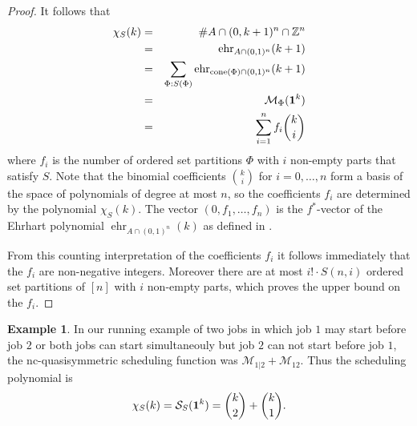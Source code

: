 \documentclass[12pt,reqno]{amsart}
\numberwithin{definition}{section}
\theoremstyle{definition}
\newtheorem{example}[definition]{Example}
\newcommand{\ZZ}{\mathbb{Z}}
\newcommand{\SSS}{\mathcal{S}}
\newcommand{\ehr}{\operatorname{ehr}}
\newcommand{\cone}{\operatorname{cone}}
\newcommand{\ncM}{\mathcal{M}}
\newcommand{\poly}{\chi} %
\begin{document}
\begin{proof}
It follows that
\begin{eqnarray*}
  \poly_S(k) &=& \#A\cap(0,k+1)^n\cap\ZZ^n \\
  &=& \ehr_{A\cap(0,1)^n}(k+1) \\
  &=& \sum_{\Phi:S(\Phi)} \ehr_{\cone(\Phi)\cap(0,1)^n}(k+1) \\
  &=& \ncM_{\Phi}({\bf 1}^k) \\  
&=& \sum_{i=1}^n f_i\binom{k}{i}
\end{eqnarray*}
where $f_i$ is the number of ordered set partitions $\Phi$ with $i$ non-empty parts that satisfy $S$. Note that the binomial coefficients $\binom{k}{i}$ for $i=0,\ldots,n$ form a basis of the space of polynomials of degree at most $n$, so the coefficients $f_i$ are determined by the polynomial $\poly_S(k)$. The vector $(0,f_1,\ldots,f_n)$ is the $f^*$-vector of the Ehrhart polynomial $\ehr_{A\cap(0,1)^n}(k)$ as defined in \cite{fstar}.

From this counting interpretation of the coefficients $f_i$ it follows immediately that the $f_i$ are non-negative integers. Moreover there are at most $i!\cdot S(n,i)$ ordered set partitions of $[n]$ with $i$ non-empty parts, which proves the upper bound on the $f_i$. 

\end{proof}


\begin{example}
In our running example of two jobs in which job $1$ may start before job $2$ or both jobs can start simultaneouly but job $2$ can not start before job $1$, the nc-quasisymmetric scheduling function was $\ncM_{1|2} + \ncM_{12}$.  Thus the scheduling polynomial is
$$\poly_S(k) = \SSS_S({\bf 1}^k) = \binom{k}{2} + \binom{k}{1}.$$
\end{example}
\end{document}
